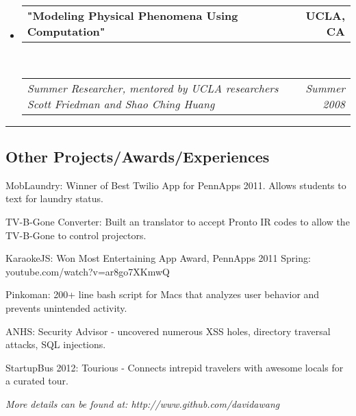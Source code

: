 \documentclass[10pt,letterpaper]{article}
\makeatletter
\newenvironment{indentsection}[1]%
{\begin{list}{}%
  {\setlength{\leftmargin}{#1}}%
  \item[]%
}
{\end{list}}
\newcommand{\headerrow}[2]
{\begin{tabular*}{\linewidth}{l@{\extracolsep{\fill}}r}
  #1 &
  #2 \\
\end{tabular*}}
\makeatother
\begin{document}
\begin{itemize}
  \item
  \headerrow
    {\textbf{"Modeling Physical Phenomena Using Computation"}}
    {\textbf{UCLA, CA}}
  \\
  \headerrow
    {\emph{Summer Researcher, mentored by UCLA researchers Scott Friedman and Shao Ching Huang }}
    {\emph{Summer 2008}}

\end{itemize}


\hrule
\vspace{-0.4em}
\subsection*{Other Projects/Awards/Experiences}

\begin{indentsection}{\parindent}
\begin{description*}
  \item[MobLaundry:] Winner of Best Twilio App for PennApps 2011. Allows students to text for laundry status.
  \item[TV-B-Gone Converter:] Built an translator to accept Pronto IR codes to allow the TV-B-Gone to control projectors.
  \item[KaraokeJS:] Won Most Entertaining App Award, PennApps 2011 Spring: youtube.com/watch?v=ar8go7XKmwQ
  \item[Pinkoman:] 200+ line bash script for Macs that analyzes user behavior and prevents unintended activity.
  \item[ANHS:] Security Advisor - uncovered numerous XSS holes, directory traversal attacks, SQL injections.
  \item[StartupBus 2012:] Tourious - Connects intrepid travelers with awesome locals for a curated tour.
\end{description*}
\textit{More details can be found at: http://www.github.com/davidawang} 
\end{indentsection}
\end{document}
